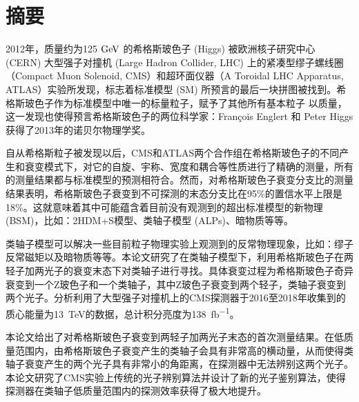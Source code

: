 
\maketitle%
\MAKETITLE%
\makedeclaration%
\intobmk\chapter*{摘\quad 要}%
\setcounter{page}{1}%

2012年，质量约为125$\GeV$ 的希格斯玻色子 (Higgs) 被欧洲核子研究中心 (CERN) 大型强子对撞机 (Large Hadron Collider, LHC) 上的紧凑型缪子螺线圈（Compact Muon Solenoid, CMS）和超环面仪器（A Toroidal LHC Apparatus, ATLAS）实验所发现，标志着标准模型 (SM) 所预言的最后一块拼图被找到。希格斯玻色子作为标准模型中唯一的标量粒子，赋予了其他所有基本粒子
以质量，这一发现也使得预言希格斯玻色子的两位科学家：François Englert 和 Peter Higgs 获得了2013年的诺贝尔物理学奖。

自从希格斯粒子被发现以后，CMS和ATLAS两个合作组在希格斯玻色子的不同产生和衰变模式下，对它的自旋、宇称、宽度和耦合等性质进行了精确的测量，所有的测量结果都与标准模型的预测相符合。然而，对希格斯玻色子衰变分支比的测量结果表明，希格斯玻色子衰变到不可探测的末态分支比在95\%的置信水平上限是18\%。这就意味着其中可能蕴含着目前没有观测到的超出标准模型的新物理 (BSM)，比如：2HDM+S模型、类轴子模型 (ALPs)、暗物质等等。

类轴子模型可以解决一些目前粒子物理实验上观测到的反常物理现象，比如：缪子反常磁矩以及暗物质等等。本论文研究了在类轴子模型下，利用希格斯玻色子在两轻子加两光子的衰变末态下对类轴子进行寻找。具体衰变过程为希格斯玻色子奇异衰变到一个Z玻色子和一个类轴子，其中Z玻色子衰变到两个轻子，类轴子衰变到两个光子。分析利用了大型强子对撞机上的CMS探测器于2016至2018年收集到的质心能量为13~\si{\TeV}的数据，总计积分亮度为138~\si{fb^{-1}}。

本论文给出了对希格斯玻色子衰变到两轻子加两光子末态的首次测量结果。在低质量范围内，由希格斯玻色子衰变产生的类轴子会具有非常高的横动量，从而使得类轴子衰变产生的两个光子具有非常小的角距离，在探测器中无法辨别这两个光子。本论文研究了CMS实验上传统的光子辨别算法并设计了新的光子鉴别算法，使得探测器在类轴子低质量范围内的探测效率获得了极大地提升。

